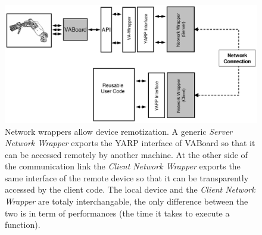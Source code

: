 \begin{figure}[tbp]
\centerline{
\includegraphics[width=24cm]{fig-devices3}
}
\caption{Network wrappers allow device remotization. A generic 
\emph{Server Network Wrapper} exports the YARP interface of VABoard so 
that it can be accessed remotely by another machine. At the 
other side of the 
communication link the \emph{Client Network Wrapper} exports the same 
interface of the remote device so that it can be transparently accessed 
by the client code. The local device and the \emph{Client Network Wrapper}
 are totaly interchangable, the only difference between the two is in 
term of performances (the time it takes to execute a function).
}\label{fig:devices3}
\end{figure}



